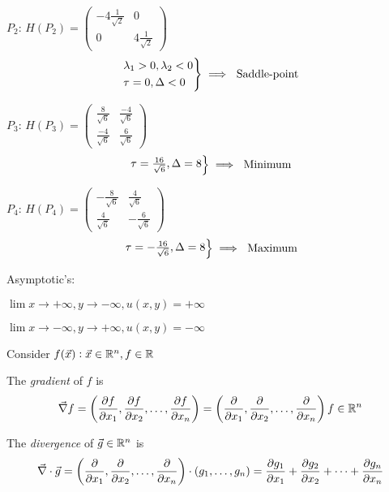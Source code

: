 \documentclass[10pt]{scrartcl}
\begin{document}
\begin{example}
\begin{enumerate}
$P_2$: 
$H(P_2) = \begin{pmatrix}
 -4\frac{1}{\sqrt{2}}& 0 \\ 0 & 4\frac{1}{\sqrt{2}}	
 \end{pmatrix}
$
\[\begin{rcases*}
\lambda_1 > 0, \lambda_2 < 0 \\
\tau = 0, \Delta < 0	
\end{rcases*}\implies \text{ Saddle-point}
\]

$P_3$: 
$H(P_3) = \begin{pmatrix}
 \frac{8}{\sqrt{6}}& \frac{-4}{\sqrt{6}} \\ \frac{-4}{\sqrt{6}} & \frac{6}{\sqrt{6}}	
 \end{pmatrix}
$
\[\begin{rcases*}
\tau = \frac{16}{\sqrt{6}}, \Delta = 8
\end{rcases*}\implies \text{ Minimum}
\]

$P_4$: 
$H(P_4) = \begin{pmatrix}
 -\frac{8}{\sqrt{6}}& \frac{4}{\sqrt{6}} \\ \frac{4}{\sqrt{6}} & -\frac{6}{\sqrt{6}}	
 \end{pmatrix}
$
\[\begin{rcases*}
\tau = -\frac{16}{\sqrt{6}}, \Delta = 8
\end{rcases*}\implies \text{ Maximum}
\]


\end{enumerate}
\vspace*{150pt}

Asymptotic's:

$\lim x \to +\infty, y \to -\infty, u(x,y) = +\infty$

$\lim x \to -\infty, y \to +\infty, u(x,y) = -\infty$
\end{example}



\vspace*{5pt}


Consider $f(\vec{x}): \vec{x} \in\mathbb{R}^n, f \in\mathbb{R}$\\

\begin{definition}
The \emph{gradient} of $f$ is
\[\vec{\nabla}f = \left(\frac{\partial f}{\partial x_1}, \frac{\partial f}{\partial x_2},\dots,\frac{\partial f}{\partial x_n}\right) = \left(\frac{\partial}{\partial x_1}, \frac{\partial}{\partial x_2},\dots,\frac{\partial}{\partial x_n}\right)f \in\mathbb{R}^n\]

The \emph{divergence} of $\vec{g} \in\mathbb{R}^n$ is 
\[\vec{\nabla}\cdot \vec{g} = \left(\frac{\partial}{\partial x_1},\frac{\partial}{\partial x_2},\dots,\frac{\partial}{\partial x_n}\right)\cdot(g_1,\dots,g_n) = \frac{\partial g_1}{\partial x_1} + \frac{\partial g_2}{\partial x_2} + \dots + \frac{\partial g_n}{\partial x_n}\]
\end{definition}
\end{document}
